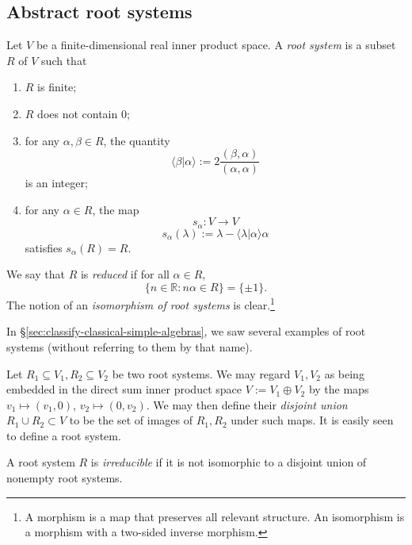 \documentclass[reqno]{amsart} 
\begin{document}
\subsection{Abstract root systems}
\label{sec:orgc2613cc}
\begin{definition}
  \label{defn:abstract-root-system}
  Let $V$ be a finite-dimensional real inner product space.  A \emph{root system} is a subset $R$ of $V$ such that
  \begin{enumerate}
  \item $R$ is finite;
  \item $R$ does not contain $0$;
  \item for any $\alpha,\beta \in R$, the quantity
    \begin{equation*}
      \langle \beta|\alpha \rangle := 2\frac{(\beta,\alpha)}{(\alpha,\alpha)}
    \end{equation*}
    is an integer;
  \item for any $\alpha \in R$, the map
    \begin{equation*}
      s_\alpha : V \rightarrow V
    \end{equation*}
    \begin{equation*}
      s_\alpha(\lambda) := \lambda - \langle \lambda | \alpha \rangle \alpha
    \end{equation*}
    satisfies $s_\alpha(R) = R$.
  \end{enumerate}
  We say that $R$ is \emph{reduced} if for all $\alpha \in R$,
  \begin{equation}\label{eq:reduced-axiom-1}
    \{n \in \mathbb{R} : n \alpha \in R\} = \{\pm 1\}.
  \end{equation}
  The notion of an \emph{isomorphism of root systems} is clear.\footnote{ A morphism is a map that preserves all relevant structure.  An isomorphism is a morphism with a two-sided inverse morphism.  }
\end{definition}

In \S\ref{sec:classify-classical-simple-algebras}, we saw several examples of root systems (without referring to them by that name).

\begin{example}\label{ex:disj-union-root-systems}
  Let $R_1 \subseteq V_1, R_2 \subseteq V_2$ be two root systems.  We may regard $V_1, V_2$ as being embedded in the direct sum inner product space $V := V_1 \oplus V_2$ by the maps $v_1 \mapsto (v_1,0)$, $v_2 \mapsto (0,v_2)$.  We may then define their \emph{disjoint union} $R_1 \cup R_2 \subset V$ to be the set of images of $R_1,R_2$ under such maps.  It is easily seen to define a root system.
\end{example}
\begin{definition}
  A root system $R$ is \emph{irreducible} if it is not isomorphic to a disjoint union of nonempty root systems.
\end{definition}
\end{document}
